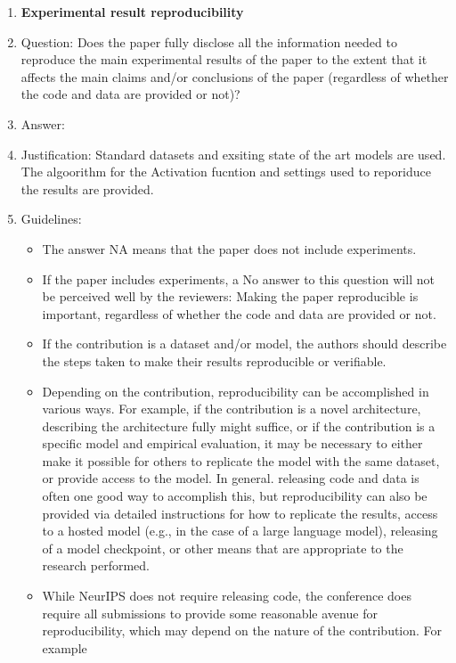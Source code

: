 \documentclass{article}
\begin{document}
\begin{enumerate}
    \item {\bf Experimental result reproducibility}
    \item[] Question: Does the paper fully disclose all the information needed to reproduce the main experimental results of the paper to the extent that it affects the main claims and/or conclusions of the paper (regardless of whether the code and data are provided or not)?
    \item[] Answer: \answerYes{} %
    \item[] Justification: Standard datasets and exsiting state of the art models are used. The algoorithm for the Activation fucntion and settings used to reporiduce the results are provided.
    \item[] Guidelines: 
    \begin{itemize}
        \item The answer NA means that the paper does not include experiments.
        \item If the paper includes experiments, a No answer to this question will not be perceived well by the reviewers: Making the paper reproducible is important, regardless of whether the code and data are provided or not.
        \item If the contribution is a dataset and/or model, the authors should describe the steps taken to make their results reproducible or verifiable. 
        \item Depending on the contribution, reproducibility can be accomplished in various ways. For example, if the contribution is a novel architecture, describing the architecture fully might suffice, or if the contribution is a specific model and empirical evaluation, it may be necessary to either make it possible for others to replicate the model with the same dataset, or provide access to the model. In general. releasing code and data is often one good way to accomplish this, but reproducibility can also be provided via detailed instructions for how to replicate the results, access to a hosted model (e.g., in the case of a large language model), releasing of a model checkpoint, or other means that are appropriate to the research performed.
        \item While NeurIPS does not require releasing code, the conference does require all submissions to provide some reasonable avenue for reproducibility, which may depend on the nature of the contribution. For example
        \begin{enumerate}

\end{enumerate}
\end{itemize}
\end{enumerate}
\end{document}
